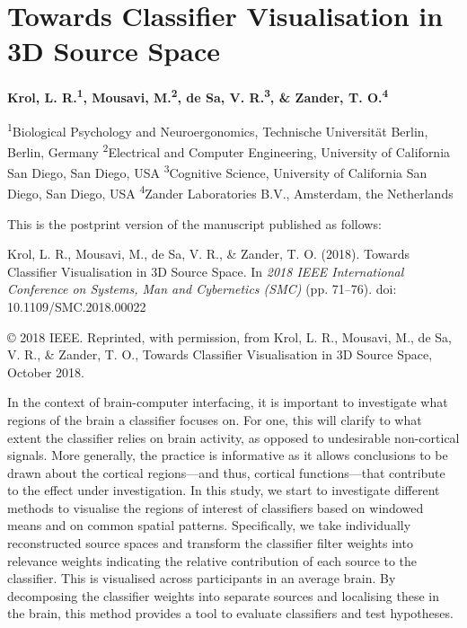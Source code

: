 
\chapter{Towards Classifier Visualisation in 3D Source Space}
%
\label{chapter:visualisation}%


{\chaptermeta

\textbf{Krol, L. R.\textsuperscript{1}, Mousavi, M.\textsuperscript{2}, de Sa, V. R.\textsuperscript{3}, \& Zander, T. O.\textsuperscript{4}}

{\small
\textsuperscript{1}Biological Psychology and Neuroergonomics, Technische Universität Berlin, Berlin, Germany
\textsuperscript{2}Electrical and Computer Engineering, University of California San Diego, San Diego, USA
\textsuperscript{3}Cognitive Science, University of California San Diego, San Diego, USA
\textsuperscript{4}Zander Laboratories B.V., Amsterdam, the Netherlands

This is the postprint version of the manuscript published as follows:

Krol, L. R., Mousavi, M., de Sa, V. R., \& Zander, T. O. (2018). Towards Classifier Visualisation in 3D Source Space. In \emph{2018 IEEE International Conference on Systems, Man and Cybernetics (SMC)} (pp. 71–76). doi: 10.1109/SMC.2018.00022\nocite{krol2018classvis}

© 2018 IEEE. Reprinted, with permission, from Krol, L. R., Mousavi, M., de Sa, V. R., \& Zander, T. O., Towards Classifier Visualisation in 3D Source Space, October 2018.
\par}}


\abstract%
In the context of brain-computer interfacing, it is important to investigate what regions of the brain a classifier focuses on. For one, this will clarify to what extent the classifier relies on brain activity, as opposed to undesirable non-cortical signals. More generally, the practice is informative as it allows conclusions to be drawn about the cortical regions---and thus, cortical functions---that contribute to the effect under investigation. In this study, we start to investigate different methods to visualise the regions of interest of classifiers based on windowed means and on common spatial patterns. Specifically, we take individually reconstructed source spaces and transform the classifier filter weights into relevance weights indicating the relative contribution of each source to the classifier. This is visualised across participants in an average brain. By decomposing the classifier weights into separate sources and localising these in the brain, this method provides a tool to evaluate classifiers and test hypotheses.


